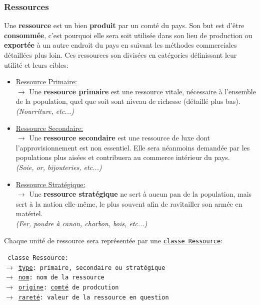 \documentclass{article}
\newcommand{\ulcolor}[2][class]{\setulcolor{#1}\ul{#2}}
\newcommand{\ulcolor}[2][var]{\setulcolor{#1}\ul{#2}}
\newcommand{\ulcolor}[2][func]{\setulcolor{#1}\ul{#2}}
\newcommand*{\mybox}[2]{\colorbox{#1!30}{\parbox{.98\linewidth}{#2}}}
\newcommand\tab[1][0.5cm]{\hspace*{#1}}
\newcommand{\genbox}[1]{\mybox{verylightgray}{#1}}
\newcommand{\classbox}[1]{\mybox{palegreen}{\texttt{\textcolor{codeColour}{#1}}}}
\newcommand{\class}[1]{\texttt{\textcolor{codeColour}{\ulcolor[class]{#1}}}}
\newcommand{\var}[1]{\texttt{\textcolor{codeColour}{\ulcolor[var]{#1}}}}
\begin{document}
            \subsubsection{Ressources}
                Une \textbf{ressource} est un bien \textbf{produit} par un comté du pays. Son but est d'être \textbf{consommée}, c'est pourquoi elle sera soit utilisée dans son lieu de production ou \textbf{exportée} à un autre endroit du pays en suivant les méthodes commerciales détaillées plus loin. Ces ressources son divisées en catégories définissant leur utilité et leurs cibles:
                    \begin{itemize}
                        \item \underline{Ressource Primaire: } \\
                            $\rightarrow$ Une \textbf{ressource primaire} est une ressource vitale, nécessaire à l'ensemble de la population, quel que soit sont niveau de richesse (détaillé plus bas). \\
                            \emph{(Nourriture, etc...)}
                        \item \underline{Ressource Secondaire: } \\
                            $\rightarrow$ Une \textbf{ressource secondaire} est une ressource de luxe dont l'approvisionnement est non essentiel. Elle sera néanmoins demandée par les populations plus aisées et contribuera au commerce intérieur du pays. \\
                            \emph{(Soie, or, bijouteries, etc...)}
                        \item \underline{Ressource Stratégique: } \\
                            $\rightarrow$ Une \textbf{ressource stratégique} ne sert à aucun pan de la population, mais sert à la nation elle-même, le plus souvent afin de ravitailler son armée en matériel. \\
                            \emph{(Fer, poudre à canon, charbon, bois, etc...)}
                    \end{itemize}

                \tab \genbox{
                    Chaque unité de ressource sera représentée par une \class{classe Ressource}: \\
                    \tab\classbox{
                        classe Ressource: \\
                            $\rightarrow$ \var{type}: primaire, secondaire ou stratégique \\
                            $\rightarrow$ \var{nom}: nom de la ressource \\
                            $\rightarrow$ \var{origine}: \class{comt\'e} de prodcution\\
                            $\rightarrow$ \var{raret\'e}: valeur de la ressource en question \\
                    }
                }
                
\end{document}
